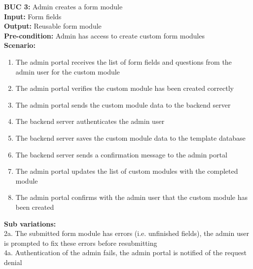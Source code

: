 \documentclass[12pt]{article}
\begin{document}
\noindent\textbf{BUC 3: } Admin creates a form module \\
\textbf{Input:} Form fields \\
\textbf{Output:} Reusable form module \\
\textbf{Pre-condition:} Admin has access to create custom form modules \\
\textbf{Scenario:} \\
\begin{enumerate}
  \item The admin portal receives the list of form fields and questions from the admin user for the custom module
  \item The admin portal verifies the custom module has been created correctly
  \item The admin portal sends the custom module data to the backend server
  \item The backend server authenticates the admin user
  \item The backend server saves the custom module data to the template database
  \item The backend server sends a confirmation message to the admin portal
  \item The admin portal updates the list of custom modules with the completed module
  \item The admin portal confirms with the admin user that the custom module has been created
\end{enumerate}
\textbf{Sub variations:} \\
2a. The submitted form module has errors (i.e. unfinished fields), the admin user is prompted to fix these errors before resubmitting \\
4a. Authentication of the admin fails, the admin portal is notified of the request denial \\
\end{document}
